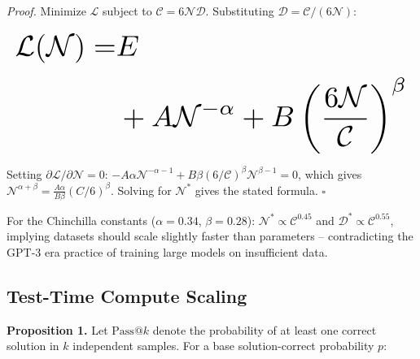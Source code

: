 \documentclass{article}
\begin{document}
\textit{Proof.} Minimize $\mathcal{L}$ subject to $\mathcal{C} = 6\mathcal{N}\mathcal{D}$. Substituting $\mathcal{D} = \mathcal{C}/(6\mathcal{N})$:















\begin{equation}
\resizebox{\columnwidth}{!}{$\displaystyle
\begin{aligned}
\mathcal{L}(\mathcal{N}) = & E \\
& + A\mathcal{N}^{-\alpha} + B\left(\frac{6\mathcal{N}}{\mathcal{C}}\right)^\beta
\end{aligned}
$}
\end{equation}















Setting $\partial\mathcal{L}/\partial\mathcal{N} = 0$: $-A\alpha\mathcal{N}^{-\alpha-1} + B\beta(6/\mathcal{C})^\beta\mathcal{N}^{\beta-1} = 0$, which gives $\mathcal{N}^{\alpha+\beta} = \frac{A\alpha}{B\beta}(C/6)^\beta$. Solving for $\mathcal{N}^*$ gives the stated formula. $\square$

For the Chinchilla constants ($\alpha = 0.34$, $\beta = 0.28$): $\mathcal{N}^* \propto \mathcal{C}^{0.45}$ and $\mathcal{D}^* \propto \mathcal{C}^{0.55}$, implying datasets should scale slightly faster than parameters -- contradicting the GPT-3 era practice of training large models on insufficient data.


\subsection{Test-Time Compute Scaling}


\textbf{Proposition 1.} Let $\text{Pass@}k$ denote the probability of at least one correct solution in $k$ independent samples. For a base solution-correct probability $p$:
\end{document}
